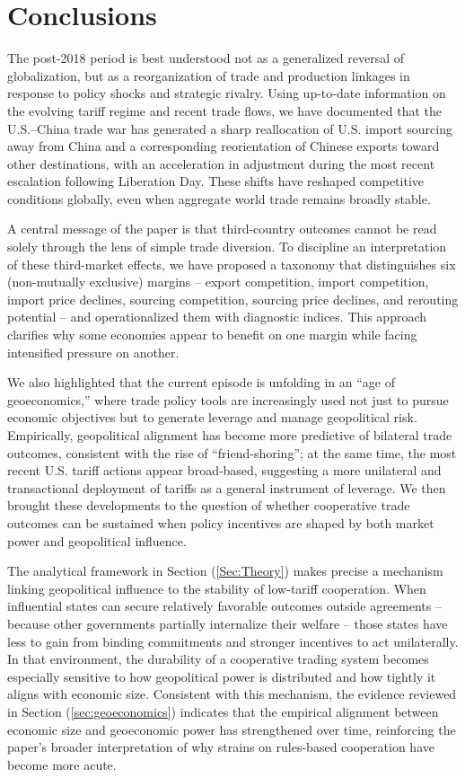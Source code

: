 \documentclass[english,12pt]{article}
\theoremstyle{definition}
\let\oldref\ref
\renewcommand{\ref}[1]{(\oldref{#1})}
\begin{document}
\section{Conclusions \label{Sec: Conclusion}}

The post-2018 period is best understood not as a generalized reversal of
globalization, but as a reorganization of trade and production linkages in
response to policy shocks and strategic rivalry. Using up-to-date
information on the evolving tariff regime and recent trade flows, we have
documented that the U.S.--China trade war has generated a sharp reallocation
of U.S. import sourcing away from China and a corresponding reorientation of
Chinese exports toward other destinations, with an acceleration in
adjustment during the most recent escalation following Liberation Day. These
shifts have reshaped competitive conditions globally, even when aggregate
world trade remains broadly stable.

A central message of the paper is that third-country outcomes cannot be read
solely through the lens of simple trade diversion. To discipline an
interpretation of these third-market effects, we have proposed a taxonomy
that distinguishes six (non-mutually exclusive) margins -- export competition,
import competition, import price declines, sourcing competition, sourcing price
declines, and rerouting potential -- and operationalized them with diagnostic indices.
This approach clarifies why some economies appear to benefit on one margin
while facing intensified pressure on another.

We also highlighted that the current episode is unfolding in an ``age of
geoeconomics,'' where trade policy tools are increasingly used not just to
pursue economic objectives but to generate leverage and manage geopolitical
risk. Empirically, geopolitical alignment has become more predictive of
bilateral trade outcomes, consistent with the rise of ``friend-shoring''; at
the same time, the most recent U.S. tariff actions appear broad-based,
suggesting a more unilateral and transactional deployment of tariffs as a
general instrument of leverage. We then brought these developments to the
question of whether cooperative trade outcomes can be sustained when policy
incentives are shaped by both market power and geopolitical influence.

The analytical framework in Section \ref{Sec:Theory} makes precise a
mechanism linking geopolitical influence to the stability of low-tariff
cooperation. When influential states can secure relatively favorable
outcomes outside agreements -- because other governments partially
internalize their welfare -- those states have less to gain from binding
commitments and stronger incentives to act unilaterally. In that
environment, the durability of a cooperative trading system becomes
especially sensitive to how geopolitical power is distributed and how
tightly it aligns with economic size. Consistent with this mechanism, the
evidence reviewed in Section \ref{sec:geoeconomics} indicates that the
empirical alignment between economic size and geoeconomic power has
strengthened over time, reinforcing the paper's broader interpretation of
why strains on rules-based cooperation have become more acute.
\end{document}
